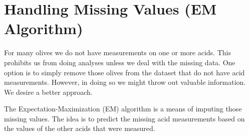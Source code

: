 \section{Handling Missing Values (EM Algorithm)}

For many olives we do not have measurements on one or more acids. This prohibits us from doing analyses unless we deal with the missing data. One option is to simply remove those olives from the dataset that do not have acid measurements. However, in doing so we might throw out valuable information. We desire a better approach.

The Expectation-Maximization (EM) algorithm is a means of imputing those missing values. The idea is to predict the missing acid measurements based on the values of the other acids that were measured.
